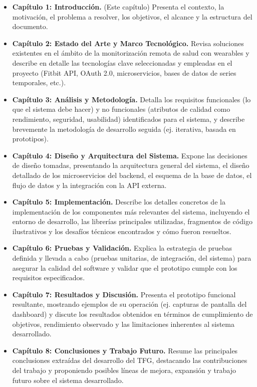 \begin{itemize}
    \item \textbf{Capítulo 1: Introducción.} (Este capítulo) Presenta el contexto, la motivación, el problema a resolver, los objetivos, el alcance y la estructura del documento.
    \item \textbf{Capítulo 2: Estado del Arte y Marco Tecnológico.} Revisa soluciones existentes en el ámbito de la monitorización remota de salud con wearables y describe en detalle las tecnologías clave seleccionadas y empleadas en el proyecto (Fitbit API, OAuth 2.0, microservicios, bases de datos de series temporales, etc.).
    \item \textbf{Capítulo 3: Análisis y Metodología.} Detalla los requisitos funcionales (lo que el sistema debe hacer) y no funcionales (atributos de calidad como rendimiento, seguridad, usabilidad) identificados para el sistema, y describe brevemente la metodología de desarrollo seguida (ej. iterativa, basada en prototipos).
    \item \textbf{Capítulo 4: Diseño y Arquitectura del Sistema.} Expone las decisiones de diseño tomadas, presentando la arquitectura general del sistema, el diseño detallado de los microservicios del backend, el esquema de la base de datos, el flujo de datos y la integración con la API externa.
    \item \textbf{Capítulo 5: Implementación.} Describe los detalles concretos de la implementación de los componentes más relevantes del sistema, incluyendo el entorno de desarrollo, las librerías principales utilizadas, fragmentos de código ilustrativos y los desafíos técnicos encontrados y cómo fueron resueltos.
    \item \textbf{Capítulo 6: Pruebas y Validación.} Explica la estrategia de pruebas definida y llevada a cabo (pruebas unitarias, de integración, del sistema) para asegurar la calidad del software y validar que el prototipo cumple con los requisitos especificados.
    \item \textbf{Capítulo 7: Resultados y Discusión.} Presenta el prototipo funcional resultante, mostrando ejemplos de su operación (ej. capturas de pantalla del dashboard) y discute los resultados obtenidos en términos de cumplimiento de objetivos, rendimiento observado y las limitaciones inherentes al sistema desarrollado.
    \item \textbf{Capítulo 8: Conclusiones y Trabajo Futuro.} Resume las principales conclusiones extraídas del desarrollo del TFG, destacando las contribuciones del trabajo y proponiendo posibles líneas de mejora, expansión y trabajo futuro sobre el sistema desarrollado.
\end{itemize}